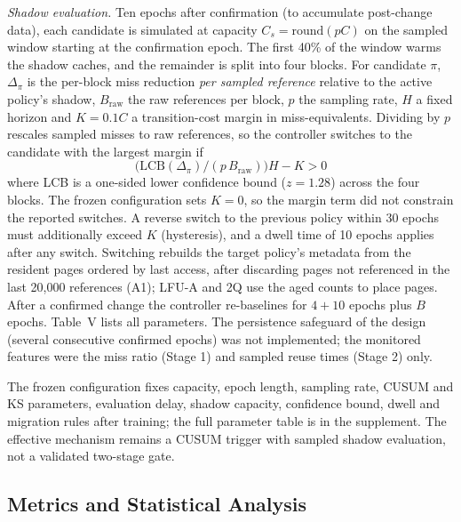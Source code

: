 \documentclass[10pt,twocolumn,a4paper]{IEEEtran}
\begin{document}
\emph{Shadow evaluation.} Ten epochs after confirmation (to accumulate
post-change data), each candidate is simulated at capacity
$C_s = \mathrm{round}(pC)$ on the sampled window starting at the confirmation
epoch. The first 40\% of the window warms the shadow caches, and the remainder
is split into four blocks. For candidate $\pi$, $\Delta_\pi$ is the per-block
miss reduction \emph{per sampled reference} relative to the active policy's
shadow, $B_{\mathrm{raw}}$ the raw references per block, $p$ the sampling rate,
$H$ a fixed horizon and $K = 0.1C$ a transition-cost margin in miss-equivalents.
Dividing by $p$ rescales sampled misses to raw references, so the controller
switches to the candidate with the largest margin if
\begin{equation}
\bigl(\mathrm{LCB}(\Delta_\pi) / (p\,B_{\mathrm{raw}})\bigr) H - K > 0
\label{eq:switch}
\end{equation}
where LCB is a one-sided lower confidence bound ($z = 1.28$) across the four
blocks. The frozen configuration sets $K = 0$, so the margin term did not
constrain the reported switches. A reverse switch to the previous policy within 30 epochs must
additionally exceed $K$ (hysteresis), and a dwell time of 10 epochs applies
after any switch. Switching rebuilds the target policy's metadata from the
resident pages ordered by last access, after discarding pages not referenced
in the last 20,000 references (A1); LFU-A and 2Q use the aged counts to place
pages. After a confirmed change the controller re-baselines for $4 + 10$ epochs
plus $B$ epochs. Table~V lists all parameters. The persistence safeguard of the
design (several consecutive confirmed epochs) was not implemented; the
monitored features were the miss ratio (Stage 1) and sampled reuse times
(Stage 2) only.

The frozen configuration fixes capacity, epoch length, sampling rate, CUSUM
and KS parameters, evaluation delay, shadow capacity, confidence bound, dwell
and migration rules after training; the full parameter table is in the
supplement. The effective mechanism remains a CUSUM trigger with sampled shadow
evaluation, not a validated two-stage gate.

\subsection{Metrics and Statistical Analysis}
\end{document}
